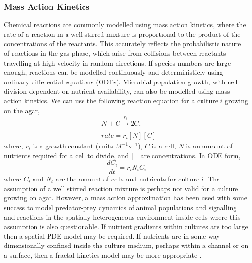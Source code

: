 \begin{multicols}{2}
\subsubsection{Mass Action Kinetics}
Chemical reactions are commonly modelled using mass action kinetics, where the rate of a
reaction in a well stirred mixture is proportional to the product of the concentrations of
the reactants. This accurately reflects the probabilistic nature of reactions in the gas
phase, which arise from collisions between reactants travelling at high velocity in random
directions. If species numbers are large enough, reactions can be modelled continuously
and deterministicly using ordinary differential equations (ODEs). Microbial population
growth, with cell division dependent on nutrient availability, can also be modelled using
mass action kinetics. We can use the following reaction equation for a culture \(i\)
growing on the agar,
\begin{subequations}
  \label{eq:9}
  \begin{align}
    &N + C \xrightarrow[]{r_{i}} 2C,\\
    &rate = r_{i}[N][C]
  \end{align}
\end{subequations}
where, \(r_{i}\) is a growth constant (units \(M^{-1}s^{-1}\)), \(C\) is a cell, \(N\) is an amount of nutrients
required for a cell to divide, and [~] are concentrations. In ODE form,
\begin{equation}
  \label{eq:10}
  \frac{dC_{i}}{dt} = r_{i}N_{i}C_{i}
\end{equation}
where \(C_{i}\) and \(N_{i}\) are the amount of cells and nutrients for culture \(i\).
The assumption of a well stirred reaction mixture is perhaps not valid for a culture
growing on agar. However, a mass action approximation has been used with some success to
model predator-prey dynamics of animal populations \citep{Berryman1992} and signalling and
reactions in the spatially heterogeneous environment inside cells
\citep{Aldridge2006,Chen2010} where this assumption is also questionable. If nutrient
gradients within cultures are too large then a spatial PDE model may be required. If
nutrients are in some way dimensionally confined inside the culture medium, perhaps within
a channel or on a surface, then a fractal kinetics model may be more appropriate
\citep{savageau1995}.

\end{multicols}
